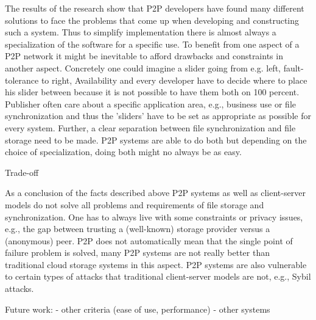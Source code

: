 The results of the research show that P2P developers have found many different solutions to face the problems that come up when developing and constructing such a system. Thus to simplify implementation there is almost always a specialization of the software for a specific use. To benefit from one aspect of a P2P network it might be inevitable to afford drawbacks and constraints in another aspect. Concretely one could imagine a slider going from e.g. left, fault-tolerance to right, Availability and every developer have to decide where to place his slider between because it is not possible to have them both on 100 percent. Publisher often care about a specific application area, e.g., business use or file synchronization and thus the 'sliders' have to be set as appropriate as possible for every system. Further, a clear separation between file synchronization and file storage need to be made. P2P systems are able to do both but depending on the choice of specialization, doing both might no always be as easy.

Trade-off

As a conclusion of the facts described above P2P systems as well as client-server models do not solve all problems and requirements of file storage and synchronization. One has to always live with some constraints or privacy issues, e.g., the gap between trusting a (well-known) storage provider versus a (anonymous) peer. P2P does not automatically mean that the single point of failure problem is solved, many P2P systems are not really better than traditional cloud storage systems in this aspect. P2P systems are also vulnerable to certain types of attacks that traditional client-server models are not, e.g., Sybil attacks.

Future work:
- other criteria (ease of use, performance)
- other systems

